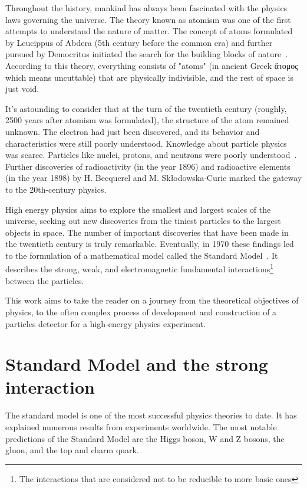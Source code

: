 Throughout the history, mankind has always been fascinated with the physics laws governing the universe. The theory known as atomism was one of the first attempts to understand the nature of matter. The concept of atoms formulated by Leucippus of Abdera (5th century before the common era) and further pursued by Democritus initiated the search for the building blocks of nature~\cite{sep-atomism-ancient}. According to this theory, everything consists of "atoms" (in ancient Greek \foreignlanguage{greek}{ἄτομος} which means uncuttable) that are physically indivisible, and the rest of space is just void. 

It's astounding to consider that at the turn of the twentieth century (roughly, 2500 years after atomism was formulated), the structure of the atom remained unknown. The electron had just been discovered, and its behavior and characteristics were still poorly understood. Knowledge about particle physics was scarce. Particles like nuclei, protons, and neutrons were poorly understood~\cite{intro_particle_physics}. 
Further discoveries of radioactivity (in the year 1896) and radioactive elements (in the year 1898) by H. Becquerel and M. Skłodowska-Curie marked the gateway to the 20th-century physics. 

High energy physics aims to explore the smallest and largest scales of the universe, seeking out new discoveries from the tiniest particles to the largest objects in space.
The number of important discoveries that have been made in the twentieth century is truly remarkable. Eventually, in 1970 these findings led to the formulation of a mathematical model called the Standard Model~\cite{intro_particle_physics}.  It describes the strong, weak, and electromagnetic fundamental interactions\footnote{The interactions that are considered not to be reducible to more basic ones} between the particles. 
 
 
 This work aims to take the reader on a journey from the theoretical objectives of physics, to the often complex process of development and construction of a particles detector for a high-energy physics experiment.
 
\section{Standard Model and the strong interaction}

The standard model is one of the most successful physics theories to date. It has explained numerous results from experiments worldwide. The most notable predictions of the Standard Model are the Higgs boson, W and Z bosons, the gluon, and the top and charm quark.

